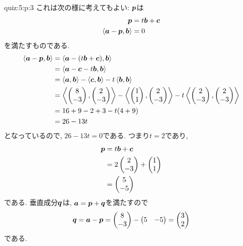 \begin{answerof}{quiz:5:p:3}
  これは次の様に考えてもよい:
  $\boldsymbol{p}$は
  \begin{align*}
    \boldsymbol{p}&=t\boldsymbol{b}+\boldsymbol{c}\\
    \Braket{\boldsymbol{a}-\boldsymbol{p},\boldsymbol{b}}&=0
  \end{align*}
  を満たすものである.
  \begin{align*}
    \Braket{\boldsymbol{a}-\boldsymbol{p},\boldsymbol{b}}&=
    \Braket{\boldsymbol{a}-(t\boldsymbol{b}+\boldsymbol{c}),\boldsymbol{b}}\\
    &=\Braket{\boldsymbol{a}-\boldsymbol{c}-t\boldsymbol{b},\boldsymbol{b}}\\
    &=\Braket{\boldsymbol{a},\boldsymbol{b}}-\Braket{\boldsymbol{c},\boldsymbol{b}}-t\Braket{\boldsymbol{b},\boldsymbol{b}}\\
    &=\Braket{\begin{pmatrix}8\\-3\end{pmatrix},\begin{pmatrix}2\\-3\end{pmatrix}}-\Braket{\begin{pmatrix}1\\1\end{pmatrix},\begin{pmatrix}2\\-3\end{pmatrix}}-t\Braket{\begin{pmatrix}2\\-3\end{pmatrix},\begin{pmatrix}2\\-3\end{pmatrix}}\\
    &=16+9-2+3-t(4+9)\\
    &=26-13t
  \end{align*}
  となっているので, $26-13t=0$である.
  つまり$t=2$であり,
  \begin{align*}
    \boldsymbol{p}&=t\boldsymbol{b}+\boldsymbol{c}\\
    &=2\begin{pmatrix}2\\-3\end{pmatrix}+\begin{pmatrix}1\\1\end{pmatrix}\\
    &=\begin{pmatrix}5\\-5\end{pmatrix}
  \end{align*}
  である.
  垂直成分$\boldsymbol{q}$は,
  $\boldsymbol{a}=\boldsymbol{p}+\boldsymbol{q}$を満たすので
  \begin{align*}
    \boldsymbol{q}=\boldsymbol{a}-\boldsymbol{p}
    =\begin{pmatrix}8\\-3\end{pmatrix}-\begin{pmatrix}5&-5\end{pmatrix}
    =\begin{pmatrix}3\\2\end{pmatrix}
  \end{align*}
  である.


\end{answerof}
